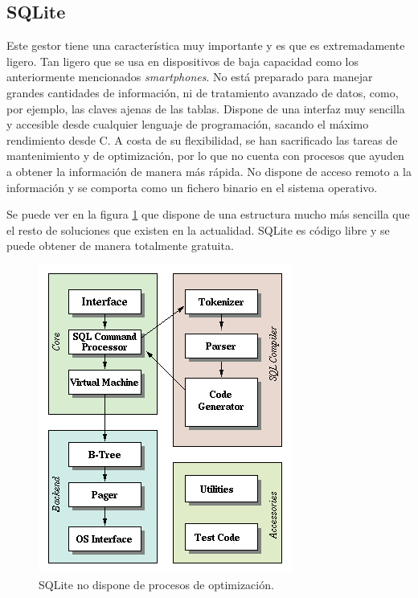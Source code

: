 \subsection{SQLite }
Este gestor tiene una característica muy importante y es que es 
extremadamente ligero. Tan ligero que se usa en dispositivos de baja 
capacidad como los anteriormente mencionados \emph{smartphones}. No 
está preparado para manejar grandes cantidades de información, ni de 
tratamiento avanzado de datos, como, por ejemplo, las claves ajenas de 
las tablas. Dispone de una interfaz muy sencilla y accesible desde 
cualquier lenguaje de programación, sacando el máximo rendimiento 
desde C. A costa de su flexibilidad, se han sacrificado las tareas de 
mantenimiento y de optimización, por lo que no cuenta con procesos que 
ayuden a obtener la información de manera más rápida. No dispone de 
acceso remoto a la información y se comporta como un fichero binario 
en el sistema operativo.

Se puede ver en la figura \ref{fig:sqlite} que dispone de una 
estructura mucho más sencilla que el resto de soluciones que existen 
en la actualidad. SQLite es código libre y se puede obtener de manera 
totalmente gratuita.

\begin{figure}
	\centering
	\includegraphics[scale=0.9]{images/sqlite.png}
	\caption[Estructura de SQLite]{SQLite no dispone de procesos de optimización.}
	\label{fig:sqlite}
\end{figure}

